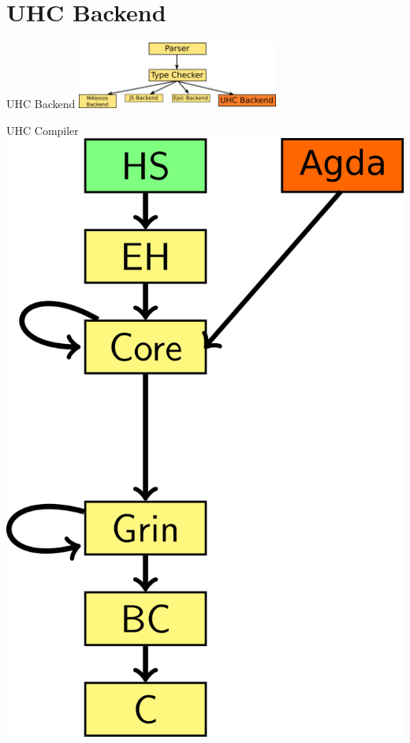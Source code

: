 \section{UHC Backend}

\begin{frame}[fragile]{UHC Backend}
\includegraphics[width=250px]{agda-arch-with-uhc.png}
\end{frame}

\begin{frame}[fragile]{UHC Compiler}
\includegraphics{uhc-arch-extr-mod.png}
\end{frame}


